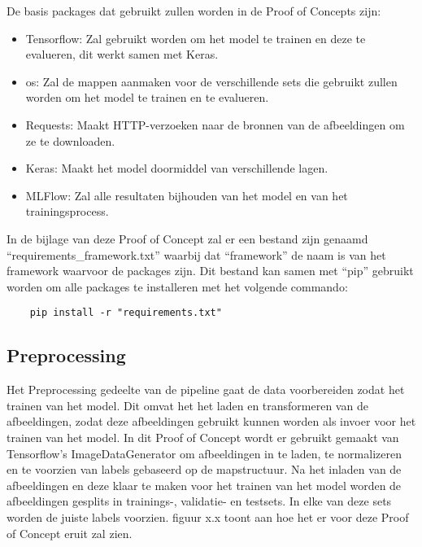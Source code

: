 De basis packages dat gebruikt zullen worden in de Proof of Concepts zijn:
\begin{itemize}
    \item Tensorflow: Zal gebruikt worden om het model te trainen en deze te evalueren, dit werkt samen met Keras.
    \item os: Zal de mappen aanmaken voor de verschillende sets die gebruikt zullen worden om het model te trainen en te evalueren.
    \item Requests: Maakt HTTP-verzoeken naar de bronnen van de afbeeldingen om ze te downloaden.
    \item Keras: Maakt het model doormiddel van verschillende lagen.
    \item MLFlow: Zal alle resultaten bijhouden van het model en van het trainingsprocess.
\end{itemize}

In de bijlage van deze Proof of Concept zal er een bestand zijn genaamd ``requirements_framework.txt'' waarbij dat ``framework'' de naam is van het framework waarvoor de packages zijn. Dit bestand kan samen met ``pip''
gebruikt worden om alle packages te installeren met het volgende commando:
\begin{verbatim}
    pip install -r "requirements.txt"
\end{verbatim}
\subsection{Preprocessing}
Het Preprocessing gedeelte van de pipeline gaat de data voorbereiden zodat het trainen van het model. Dit omvat het het laden en transformeren van de afbeeldingen, zodat deze afbeeldingen gebruikt kunnen worden als invoer voor het trainen van het model. In dit Proof of Concept wordt er gebruikt gemaakt van Tensorflow's ImageDataGenerator om afbeeldingen in te laden, te normalizeren en te voorzien van labels gebaseerd op de mapstructuur. Na het inladen van de afbeeldingen en deze klaar te maken voor het trainen van het model worden de afbeeldingen gesplits in trainings-, validatie- en testsets. In elke van deze sets worden de juiste labels voorzien. figuur x.x toont aan hoe het er voor deze Proof of Concept eruit zal zien. 
